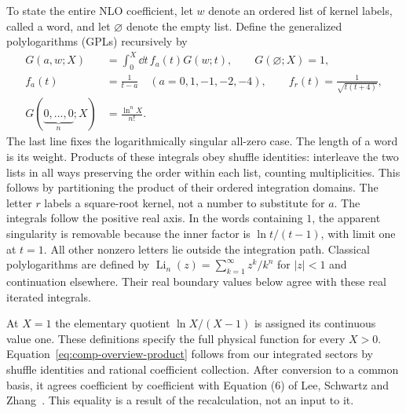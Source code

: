 To state the entire NLO coefficient, let $w$ denote an ordered list
of kernel labels, called a word, and let $\varnothing$ denote the
empty list. Define the generalized polylogarithms (GPLs) recursively by
\begin{align}
 G(a,w;X)&=\int_0^X\dd t\,f_a(t)G(w;t),\qquad G(\varnothing;X)=1,\\
 f_a(t)&=\frac1{t-a}\quad(a=0,1,-1,-2,-4),\qquad
 f_r(t)=\frac1{\sqrt{t(t+4)}},\\
 G(\underbrace{0,\ldots,0}_{n};X)&=\frac{\ln^nX}{n!}.
\end{align}
The last line fixes the logarithmically singular all-zero case.
The length of a word is its weight. Products of these integrals obey
shuffle identities: interleave the two lists in all ways preserving
the order within each list, counting multiplicities. This follows by
partitioning the product of their ordered integration domains.
The letter $r$ labels a square-root kernel, not a number to substitute
for $a$. The integrals follow the positive real axis. In the words
containing $1$, the apparent singularity is removable because the
inner factor is $\ln t/(t-1)$, with limit one at $t=1$.
All other nonzero letters lie outside the integration path.
Classical polylogarithms are defined by
$\operatorname{Li}_n(z)=\sum_{k=1}^{\infty}z^k/k^n$ for $|z|<1$
and continuation elsewhere. Their real boundary values below agree
with these real iterated integrals.

\begingroup
\def\comptonproductlabel{eq:comp-overview-product}

\endgroup
At $X=1$ the elementary quotient $\ln X/(X-1)$ is assigned its
continuous value one. These definitions specify the full physical
function for every $X>0$.
Equation~\eqref{eq:comp-overview-product} follows from our integrated
sectors by shuffle identities and rational coefficient collection.
After conversion to a common basis, it agrees coefficient by coefficient
with Equation (6) of Lee, Schwartz and Zhang~\cite{qed-processes-lsz}.
This equality is a result of the recalculation, not an input to it.

